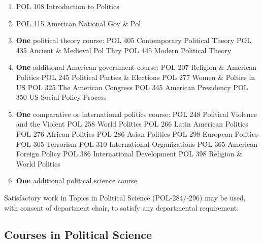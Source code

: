 \documentclass[
  letterpaper,
]{scrbook}
\begin{document}
\begin{enumerate}
\def\labelenumi{\arabic{enumi}.}
\item
  POL 108 Introduction to Politics
\item
  POL 115 American National Gov \& Pol
\item
  \textbf{One} political theory course: POL 405 Contemporary Political
  Theory POL 435 Ancient \& Medieval Pol Thry POL 445 Modern Political
  Theory
\item
  \textbf{One} additional American government course: POL 207 Religion
  \& American Politics POL 245 Political Parties \& Elections POL 277
  Women \& Poltics in US POL 325 The American Congress POL 345 American
  Presidency POL 350 US Social Policy Process
\item
  \textbf{One} comparative or international politics course: POL 248
  Political Violence and the Violent POL 258 World Politics POL 266
  Latin American Politics POL 276 African Politics POL 286 Asian
  Politics POL 298 European Politics POL 305 Terrorism POL 310
  International Organizations POL 365 American Foreign Policy POL 386
  International Development POL 398 Religion \& World Politics
\item
  \textbf{One} additional political science course
\end{enumerate}

Satisfactory work in Topics in Political Science (POL-284/-296) may be
used, with consent of department chair, to satisfy any departmental
requirement.

\hypertarget{courses-in-political-science}{%
\subsection{Courses in Political
Science}\label{courses-in-political-science}}
\end{document}
